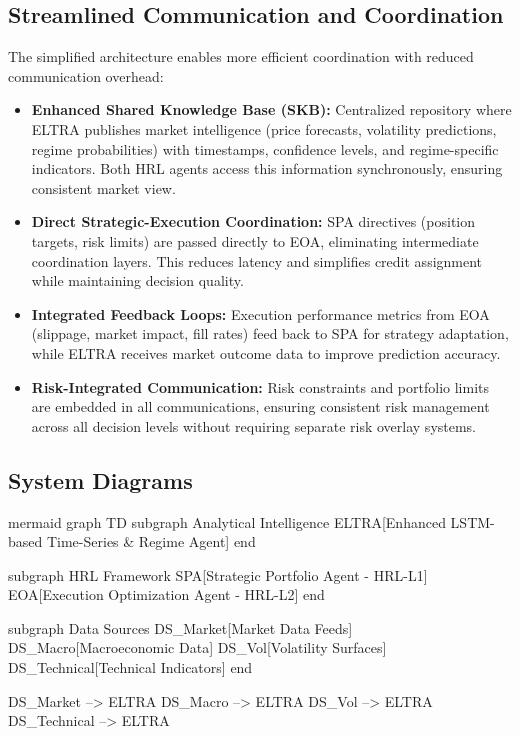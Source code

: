 \documentclass[11pt]{article}
\begin{document}
\subsection{Streamlined Communication and Coordination}

The simplified architecture enables more efficient coordination with reduced communication overhead:

\begin{itemize}
\item   \textbf{Enhanced Shared Knowledge Base (SKB):} Centralized repository where ELTRA publishes market intelligence (price forecasts, volatility predictions, regime probabilities) with timestamps, confidence levels, and regime-specific indicators. Both HRL agents access this information synchronously, ensuring consistent market view.
\item   \textbf{Direct Strategic-Execution Coordination:} SPA directives (position targets, risk limits) are passed directly to EOA, eliminating intermediate coordination layers. This reduces latency and simplifies credit assignment while maintaining decision quality.
\item   \textbf{Integrated Feedback Loops:} Execution performance metrics from EOA (slippage, market impact, fill rates) feed back to SPA for strategy adaptation, while ELTRA receives market outcome data to improve prediction accuracy.
\item   \textbf{Risk-Integrated Communication:} Risk constraints and portfolio limits are embedded in all communications, ensuring consistent risk management across all decision levels without requiring separate risk overlay systems.

\end{itemize}
\subsection{System Diagrams}

mermaid
graph TD
    subgraph Analytical Intelligence
        ELTRA[Enhanced LSTM-based Time-Series \& Regime Agent]
    end

    subgraph HRL Framework
        SPA[Strategic Portfolio Agent - HRL-L1]
        EOA[Execution Optimization Agent - HRL-L2]
    end

    subgraph Data Sources
        DS\_Market[Market Data Feeds]
        DS\_Macro[Macroeconomic Data]
        DS\_Vol[Volatility Surfaces]
        DS\_Technical[Technical Indicators]
    end

    DS\_Market --> ELTRA
    DS\_Macro --> ELTRA
    DS\_Vol --> ELTRA
    DS\_Technical --> ELTRA
\end{document}
